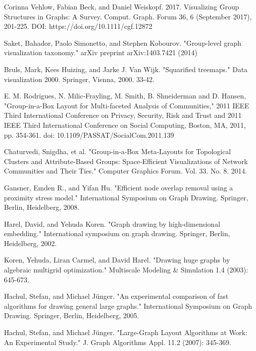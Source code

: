 \documentclass{llncs}
\begin{document}
%
%
\begin{thebibliography}{5}
%

Corinna Vehlow, Fabian Beck, and Daniel Weiskopf. 2017. Visualizing Group Structures in Graphs: A Survey. Comput. Graph. Forum 36, 6 (September 2017), 201-225. DOI: https://doi.org/10.1111/cgf.12872

Saket, Bahador, Paolo Simonetto, and Stephen Kobourov. "Group-level graph visualization taxonomy." arXiv preprint arXiv:1403.7421 (2014)

Bruls, Mark, Kees Huizing, and Jarke J. Van Wijk. "Squarified treemaps." Data visualization 2000. Springer, Vienna, 2000. 33-42.

E. M. Rodrigues, N. Milic-Frayling, M. Smith, B. Shneiderman and D. Hansen, "Group-in-a-Box Layout for Multi-faceted Analysis of Communities," 2011 IEEE Third International Conference on Privacy, Security, Risk and Trust and 2011 IEEE Third International Conference on Social Computing, Boston, MA, 2011, pp. 354-361.
doi: 10.1109/PASSAT/SocialCom.2011.139

Chaturvedi, Snigdha, et al. "Group‐in‐a‐Box Meta‐Layouts for Topological Clusters and Attribute‐Based Groups: Space‐Efficient Visualizations of Network Communities and Their Ties." Computer Graphics Forum. Vol. 33. No. 8. 2014.

Gansner, Emden R., and Yifan Hu. "Efficient node overlap removal using a proximity stress model." International Symposium on Graph Drawing. Springer, Berlin, Heidelberg, 2008.

Harel, David, and Yehuda Koren. "Graph drawing by high-dimensional embedding." International symposium on graph drawing. Springer, Berlin, Heidelberg, 2002.

Koren, Yehuda, Liran Carmel, and David Harel. "Drawing huge graphs by algebraic multigrid optimization." Multiscale Modeling \& Simulation 1.4 (2003): 645-673.

Hachul, Stefan, and Michael Jünger. "An experimental comparison of fast algorithms for drawing general large graphs." International Symposium on Graph Drawing. Springer, Berlin, Heidelberg, 2005.

Hachul, Stefan, and Michael Jünger. "Large-Graph Layout Algorithms at Work: An Experimental Study." J. Graph Algorithms Appl. 11.2 (2007): 345-369.


\end{thebibliography}
\end{document}
